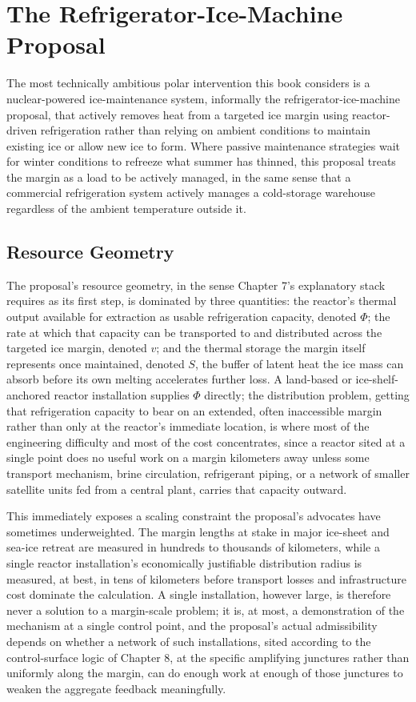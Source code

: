 \documentclass[11pt,oneside]{book}
\begin{document}
\chapter{The Refrigerator-Ice-Machine Proposal}

The most technically ambitious polar intervention this book considers is a nuclear-powered ice-maintenance system, informally the refrigerator-ice-machine proposal, that actively removes heat from a targeted ice margin using reactor-driven refrigeration rather than relying on ambient conditions to maintain existing ice or allow new ice to form. Where passive maintenance strategies wait for winter conditions to refreeze what summer has thinned, this proposal treats the margin as a load to be actively managed, in the same sense that a commercial refrigeration system actively manages a cold-storage warehouse regardless of the ambient temperature outside it.

\section*{Resource Geometry}

The proposal's resource geometry, in the sense Chapter 7's explanatory stack requires as its first step, is dominated by three quantities: the reactor's thermal output available for extraction as usable refrigeration capacity, denoted $\Phi$; the rate at which that capacity can be transported to and distributed across the targeted ice margin, denoted $v$; and the thermal storage the margin itself represents once maintained, denoted $S$, the buffer of latent heat the ice mass can absorb before its own melting accelerates further loss. A land-based or ice-shelf-anchored reactor installation supplies $\Phi$ directly; the distribution problem, getting that refrigeration capacity to bear on an extended, often inaccessible margin rather than only at the reactor's immediate location, is where most of the engineering difficulty and most of the cost concentrates, since a reactor sited at a single point does no useful work on a margin kilometers away unless some transport mechanism, brine circulation, refrigerant piping, or a network of smaller satellite units fed from a central plant, carries that capacity outward.

This immediately exposes a scaling constraint the proposal's advocates have sometimes underweighted. The margin lengths at stake in major ice-sheet and sea-ice retreat are measured in hundreds to thousands of kilometers, while a single reactor installation's economically justifiable distribution radius is measured, at best, in tens of kilometers before transport losses and infrastructure cost dominate the calculation. A single installation, however large, is therefore never a solution to a margin-scale problem; it is, at most, a demonstration of the mechanism at a single control point, and the proposal's actual admissibility depends on whether a network of such installations, sited according to the control-surface logic of Chapter 8, at the specific amplifying junctures rather than uniformly along the margin, can do enough work at enough of those junctures to weaken the aggregate feedback meaningfully.
\end{document}

